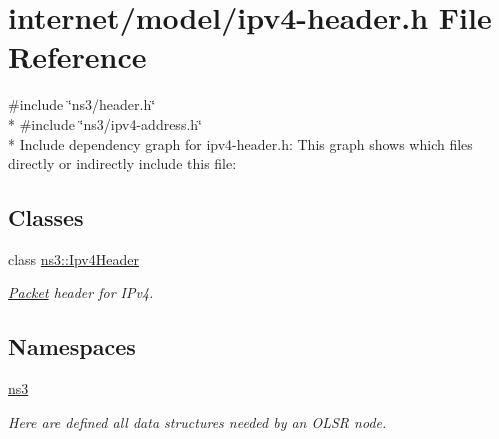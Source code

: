 \hypertarget{ipv4-header_8h}{}\section{internet/model/ipv4-\/header.h File Reference}
\label{ipv4-header_8h}
{\ttfamily \#include \char`\"{}ns3/header.\+h\char`\"{}}\\*
{\ttfamily \#include \char`\"{}ns3/ipv4-\/address.\+h\char`\"{}}\\*
Include dependency graph for ipv4-\/header.h\+:
This graph shows which files directly or indirectly include this file\+:
\subsection*{Classes}
\begin{DoxyCompactItemize}
\item 
class \hyperlink{classns3_1_1Ipv4Header}{ns3\+::\+Ipv4\+Header}
\begin{DoxyCompactList}\small\item\em \hyperlink{classns3_1_1Packet}{Packet} header for I\+Pv4. \end{DoxyCompactList}\end{DoxyCompactItemize}
\subsection*{Namespaces}
\begin{DoxyCompactItemize}
\item 
 \hyperlink{namespacens3}{ns3}
\begin{DoxyCompactList}\small\item\em Here are defined all data structures needed by an O\+L\+SR node. \end{DoxyCompactList}\end{DoxyCompactItemize}
